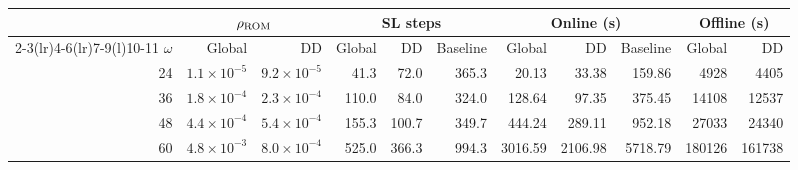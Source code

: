 \begin{tabular*}{\linewidth}{@{\extracolsep{\fill}}rrrrrrrrrrr@{}}\toprule
& \multicolumn{2}{c}{\(\rho_{\rm ROM}\)} & \multicolumn{3}{c}{SL steps} & \multicolumn{3}{c}{Online (s)} & \multicolumn{2}{c}{Offline (s)} \\
\cmidrule(lr){2-3}\cmidrule(lr){4-6}\cmidrule(lr){7-9}\cmidrule(l){10-11}
$\omega$ & Global & DD & Global & DD & Baseline & Global & DD & Baseline & Global & DD \\
\midrule
24 & \(1.1\times10^{-5}\) & \(9.2\times10^{-5}\) & 41.3 & 72.0 & 365.3 & 20.13 & 33.38 & 159.86 & 4928 & 4405 \\
36 & \(1.8\times10^{-4}\) & \(2.3\times10^{-4}\) & 110.0 & 84.0 & 324.0 & 128.64 & 97.35 & 375.45 & 14108 & 12537 \\
48 & \(4.4\times10^{-4}\) & \(5.4\times10^{-4}\) & 155.3 & 100.7 & 349.7 & 444.24 & 289.11 & 952.18 & 27033 & 24340 \\
60 & \(4.8\times10^{-3}\) & \(8.0\times10^{-4}\) & 525.0 & 366.3 & 994.3 & 3016.59 & 2106.98 & 5718.79 & 180126 & 161738 \\
\bottomrule\end{tabular*}
